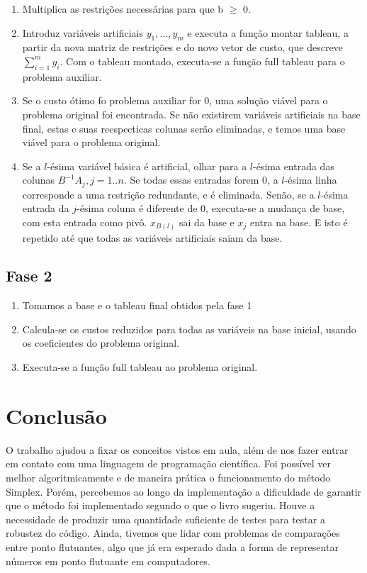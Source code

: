 \documentclass[brazil,times]{abnt}
\begin{document}
\begin{enumerate}
	\item Multiplica as restrições necessárias para que b $\geq$ 0.
	\item Introduz variáveis artificiais $y_1, ... , y_m$ e executa a função montar tableau, a partir da nova matriz de restrições e do novo vetor de custo, que descreve  $\sum_{i=1}^m y_i$. Com o tableau montado, executa-se a função full tableau para o problema auxiliar.
	\item Se o custo ótimo fo problema auxiliar for 0, uma solução viável para o problema original foi encontrada. Se não existirem variáveis artificiais na base final, estas e suas reespecticas colunas serão eliminadas, e temos uma base viável para o problema original.
	\item Se a $l$-ésima variável básica é artificial, olhar para a $l$-ésima entrada das colunas $B^{-1}A_j, j = 1..n$. Se todas essas entradas forem 0, a $l$-ésima linha corresponde a uma restrição redundante, e é eliminada. Senão, se a $l$-ésima entrada da $j$-ésima coluna é diferente de 0, executa-se a mudança de base, com esta entrada como pivô. $x_{B(l)}$ sai da base e $x_j$ entra na base. E isto é repetido até que todas as variáveis artificiais saiam da base.
\end{enumerate}

\subsection*{Fase 2}
\begin{enumerate}
	\item Tomamos a base e o tableau final obtidos pela fase 1
	\item Calcula-se os custos reduzidos para todas as variáveis na base inicial, usando os coeficientes do problema original.
	\item Executa-se a função full tableau ao problema original.
\end{enumerate}

\section*{Conclusão}
	O trabalho ajudou a fixar os conceitos vistos em aula, além de nos fazer entrar em contato com uma linguagem de programação científica. Foi possível ver melhor algoritmicamente e de maneira prática o funcionamento do método Simplex. Porém, percebemos ao longo da implementação a dificuldade de garantir que o método foi implementado segundo o que o livro sugeriu. Houve a necessidade de produzir uma quantidade suficiente de testes para testar a robustez do código. Ainda, tivemos que lidar com problemas de comparações entre ponto flutuantes, algo que já era esperado dada a forma de representar números em ponto flutuante em computadores.


\nocite{*}


\end{document}

